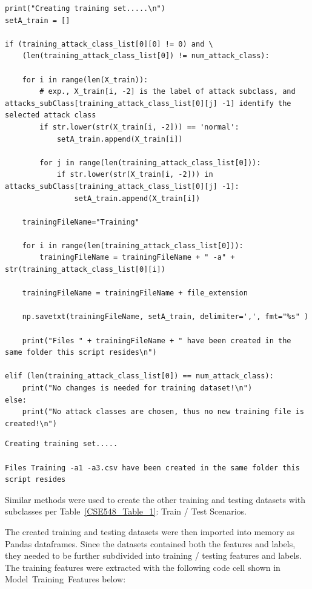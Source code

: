 \begin{verbatim}
print("Creating training set.....\n")
setA_train = []

if (training_attack_class_list[0][0] != 0) and \
    (len(training_attack_class_list[0]) != num_attack_class):

    for i in range(len(X_train)):
        # exp., X_train[i, -2] is the label of attack subclass, and attacks_subClass[training_attack_class_list[0][j] -1] identify the selected attack class
        if str.lower(str(X_train[i, -2])) == 'normal':
            setA_train.append(X_train[i])

        for j in range(len(training_attack_class_list[0])):
            if str.lower(str(X_train[i, -2])) in attacks_subClass[training_attack_class_list[0][j] -1]:
                setA_train.append(X_train[i])

    trainingFileName="Training"

    for i in range(len(training_attack_class_list[0])):
        trainingFileName = trainingFileName + " -a" + str(training_attack_class_list[0][i])

    trainingFileName = trainingFileName + file_extension

    np.savetxt(trainingFileName, setA_train, delimiter=',', fmt="%s" )

    print("Files " + trainingFileName + " have been created in the same folder this script resides\n")

elif (len(training_attack_class_list[0]) == num_attack_class):
    print("No changes is needed for training dataset!\n")
else:
    print("No attack classes are chosen, thus no new training file is created!\n")
\end{verbatim}

\begin{verbatim}
Creating training set.....

Files Training -a1 -a3.csv have been created in the same folder this script resides
\end{verbatim}

Similar methods were used to create the other training and testing datasets with subclasses per Table~\ref{CSE548_Table_1}: Train / Test Scenarios.

The created training and testing datasets were then imported into memory as Pandas dataframes.  Since the datasets contained both the features and labels, they needed to be further subdivided into training / testing features and labels.  The training features were extracted with the following code cell shown in Model~Training~Features below:

